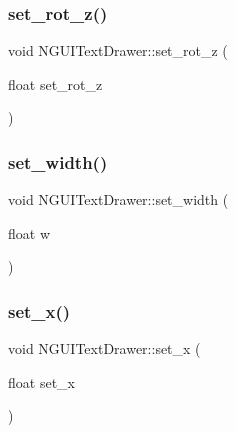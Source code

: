 \hypertarget{class_n_g_u_i_text_drawer_aa605722a123752dfdd4aa55eed3493c2}{}\label{class_n_g_u_i_text_drawer_aa605722a123752dfdd4aa55eed3493c2} 
\subsubsection{\texorpdfstring{set\+\_\+rot\+\_\+z()}{set\_rot\_z()}}
{\footnotesize\ttfamily void N\+G\+U\+I\+Text\+Drawer\+::set\+\_\+rot\+\_\+z (\begin{DoxyParamCaption}\item[{float}]{set\+\_\+rot\+\_\+z }\end{DoxyParamCaption})}

\hypertarget{class_n_g_u_i_text_drawer_a1dc7c7764886427eb8cd515c50a5dbc3}{}\label{class_n_g_u_i_text_drawer_a1dc7c7764886427eb8cd515c50a5dbc3} 
\subsubsection{\texorpdfstring{set\+\_\+width()}{set\_width()}}
{\footnotesize\ttfamily void N\+G\+U\+I\+Text\+Drawer\+::set\+\_\+width (\begin{DoxyParamCaption}\item[{float}]{w }\end{DoxyParamCaption})}

\hypertarget{class_n_g_u_i_text_drawer_afc19116a4a84c9f6d5b5363d16d162fb}{}\label{class_n_g_u_i_text_drawer_afc19116a4a84c9f6d5b5363d16d162fb} 
\subsubsection{\texorpdfstring{set\+\_\+x()}{set\_x()}}
{\footnotesize\ttfamily void N\+G\+U\+I\+Text\+Drawer\+::set\+\_\+x (\begin{DoxyParamCaption}\item[{float}]{set\+\_\+x }\end{DoxyParamCaption})}

\hypertarget{class_n_g_u_i_text_drawer_a42ccb64b8e7f6d9d1d659d9cdc8be5b5}{}\label{class_n_g_u_i_text_drawer_a42ccb64b8e7f6d9d1d659d9cdc8be5b5} 
